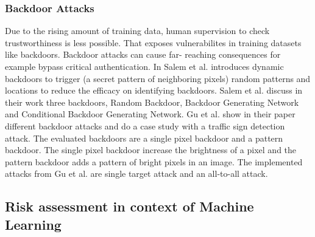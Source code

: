 \subsubsection*{Backdoor Attacks}
\label{sec:backdoor}
Due to the rising amount of training data, human supervision to check trustworthiness is less possible. That exposes vulnerabilites in training datasets like backdoors. Backdoor attacks can cause far-
reaching consequences for example bypass critical authentication. In \cite{DBLP:journals/corr/abs-2003-03675} Salem et al. introduces dynamic backdoors to trigger (a secret pattern of neighboring
pixels) random patterns and locations to reduce the efficacy on identifying backdoors. Salem et al. discuss in their work three backdoors, Random Backdoor, Backdoor Generating Network and Conditional
Backdoor Generating Network.
Gu et al. show in their paper different backdoor attacks and do a case study with a traffic sign detection attack. The evaluated backdoors are a single pixel backdoor and a pattern backdoor. The single
pixel backdoor increase the brightness of a pixel and the pattern backdoor adds a pattern of bright pixels in an image. The implemented attacks from Gu et al. are single target attack and an all-to-all attack.

\subsection{Risk assessment in context of Machine Learning}

